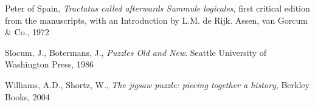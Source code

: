 \documentclass[a4paper,UKenglish]{lipics}
\begin{document}
\begin{thebibliography}{50}
Peter of Spain, \textit{Tractatus called afterwards Summule logicales}, first critical edition from the manuscripts, with an Introduction by L.M. de Rijk. Assen, van Gorcum \& Co., 1972

Slocum, J., Botermans, J., \textit{Puzzles Old and New}. Seattle University of Washington Press, 1986

Williams, A.D., Shortz, W., \textit{The jigsaw puzzle: piecing together a history}, Berkley Books, 2004

\end{thebibliography}
\end{document}
